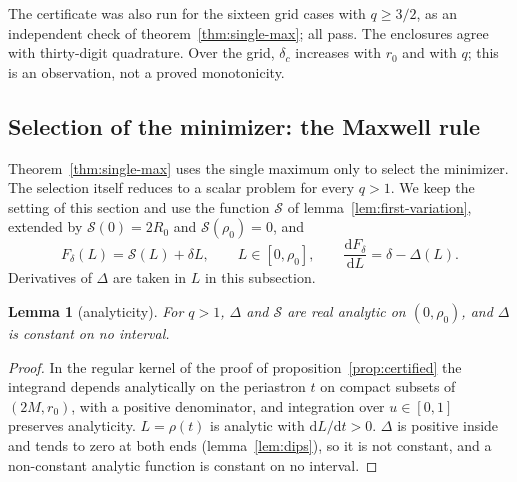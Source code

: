 \documentclass[aip,jmp,amsmath,amssymb,reprint]{revtex4-2}
\newcommand{\dd}{\mathrm{d}}
\theoremstyle{plain}
\newtheorem{lemma}[proposition]{Lemma}
\theoremstyle{definition}
\begin{document}
The certificate was also run for the sixteen grid cases with $q\ge3/2$, as an independent check of
theorem~\ref{thm:single-max}; all pass.
The enclosures agree with thirty-digit quadrature. Over the grid, $\delta_c$ increases with
$r_0$ and with $q$; this is an observation, not a proved monotonicity.

\subsection{Selection of the minimizer: the Maxwell rule}
Theorem~\ref{thm:single-max} uses the single maximum only to select the minimizer. The
selection itself reduces to a scalar problem for every $q>1$. We keep the setting of this
section and use the function $\mathcal S$ of lemma~\ref{lem:first-variation}, extended by
$\mathcal S(0)=2R_0$ and $\mathcal S(\rho_0)=0$, and
\[
  F_\delta(L)=\mathcal S(L)+\delta L,\qquad L\in[0,\rho_0],\qquad
  \frac{\dd F_\delta}{\dd L}=\delta-\Delta(L).
\]
Derivatives of $\Delta$ are taken in $L$ in this subsection.

\begin{lemma}[analyticity]\label{lem:analytic}
For $q>1$, $\Delta$ and $\mathcal S$ are real analytic on $(0,\rho_0)$, and $\Delta$ is
constant on no interval.
\end{lemma}

\begin{proof}
In the regular kernel of the proof of proposition~\ref{prop:certified} the integrand depends
analytically on the periastron $t$ on compact subsets of $(2M,r_0)$, with a positive
denominator, and integration over $u\in[0,1]$ preserves analyticity. $L=\rho(t)$ is analytic
with $\dd L/\dd t>0$. $\Delta$ is positive inside and tends to zero at both ends
(lemma~\ref{lem:dips}), so it is not constant, and a non-constant analytic function is
constant on no interval.
\end{proof}
\end{document}
